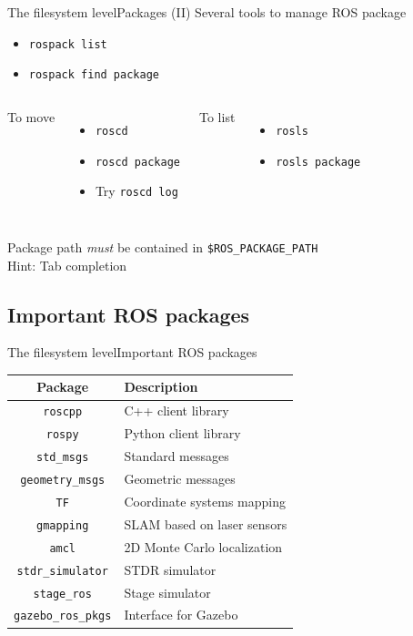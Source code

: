 \documentclass[10pt,compress]{beamer} %
\begin{document}
\begin{frame}{The filesystem level}{Packages (II)}
	Several tools to manage ROS package
	\begin{itemize}
		\item \texttt{rospack list}
		\item \texttt{rospack find package}
	\end{itemize}
    \hspace{1cm}\begin{columns}
	To move
	\begin{itemize}
		\item \texttt{roscd}
		\item \texttt{roscd package}
		\item Try \texttt{roscd log}
	\end{itemize}
	To list
	\begin{itemize}
		\item \texttt{rosls}
		\item \texttt{rosls package}
	\end{itemize}
	\end{columns}
	\bigskip
	Package path \textit{must} be contained in \texttt{\$ROS\_PACKAGE\_PATH}\\
	Hint: Tab completion
\end{frame}

\subsection{Important ROS packages}
\begin{frame}{The filesystem level}{Important ROS packages}
\begin{center}
  \begin{tabular}{cl} \hline
  	{\sc Package} 		& {\sc Description} \\ \hline 
	\texttt{roscpp} 	& C++ client library     \\ 
	\texttt{rospy} 		& Python client library     \\ \hline
	\texttt{std\_msgs}	& Standard messages     \\ 
	\texttt{geometry\_msgs}	& Geometric messages     \\ \hline
	\texttt{TF} 		& Coordinate systems mapping     \\ 
	\texttt{gmapping} 	& SLAM based on laser sensors     \\ 
	\texttt{amcl} 		& 2D Monte Carlo localization     \\ \hline
	\texttt{stdr\_simulator} & STDR simulator   \\ 
	\texttt{stage\_ros}	& Stage simulator   \\ 
	\texttt{gazebo\_ros\_pkgs} & Interface for Gazebo   \\ \hline
    \end{tabular}
\end{center}

\end{frame}
\end{document}
